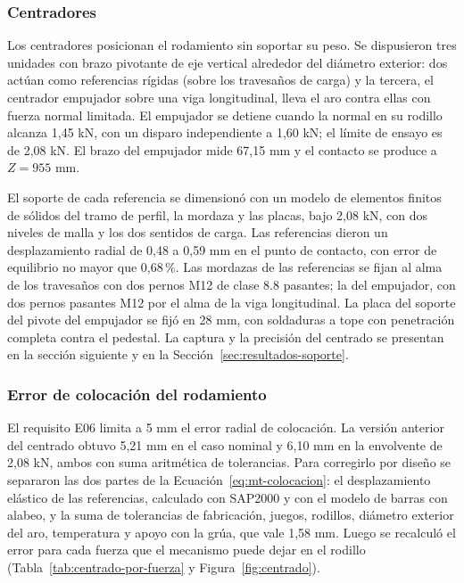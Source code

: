 \subsubsection{Centradores}
\label{sec:dimensionamiento-centradores}

Los centradores posicionan el rodamiento sin soportar su peso. Se dispusieron tres unidades con brazo pivotante de eje vertical alrededor del diámetro exterior: dos actúan como referencias rígidas (sobre los travesaños de carga) y la tercera, el centrador empujador sobre una viga longitudinal, lleva el aro contra ellas con fuerza normal limitada. El empujador se detiene cuando la normal en su rodillo alcanza 1,45 kN, con un disparo independiente a 1,60 kN; el límite de ensayo es de 2,08 kN. El brazo del empujador mide 67,15 mm y el contacto se produce a $Z=955$ mm.

El soporte de cada referencia se dimensionó con un modelo de elementos finitos de sólidos del tramo de perfil, la mordaza y las placas, bajo 2,08 kN, con dos niveles de malla y los dos sentidos de carga. Las referencias dieron un desplazamiento radial de 0,48 a 0,59 mm en el punto de contacto, con error de equilibrio no mayor que 0,68\,\%. Las mordazas de las referencias se fijan al alma de los travesaños con dos pernos M12 de clase 8.8 pasantes; la del empujador, con dos pernos pasantes M12 por el alma de la viga longitudinal. La placa del soporte del pivote del empujador se fijó en 28 mm, con soldaduras a tope con penetración completa contra el pedestal. La captura y la precisión del centrado se presentan en la sección siguiente y en la Sección~\ref{sec:resultados-soporte}.

\subsubsection{Error de colocación del rodamiento}
\label{sec:error-colocacion}

El requisito E06 limita a 5 mm el error radial de colocación. La versión anterior del centrado obtuvo 5,21 mm en el caso nominal y 6,10 mm en la envolvente de 2,08 kN, ambos con suma aritmética de tolerancias. Para corregirlo por diseño se separaron las dos partes de la Ecuación~\eqref{eq:mt-colocacion}: el desplazamiento elástico de las referencias, calculado con SAP2000 y con el modelo de barras con alabeo, y la suma de tolerancias de fabricación, juegos, rodillos, diámetro exterior del aro, temperatura y apoyo con la grúa, que vale 1,58 mm. Luego se recalculó el error para cada fuerza que el mecanismo puede dejar en el rodillo (Tabla~\ref{tab:centrado-por-fuerza} y Figura~\ref{fig:centrado}).

